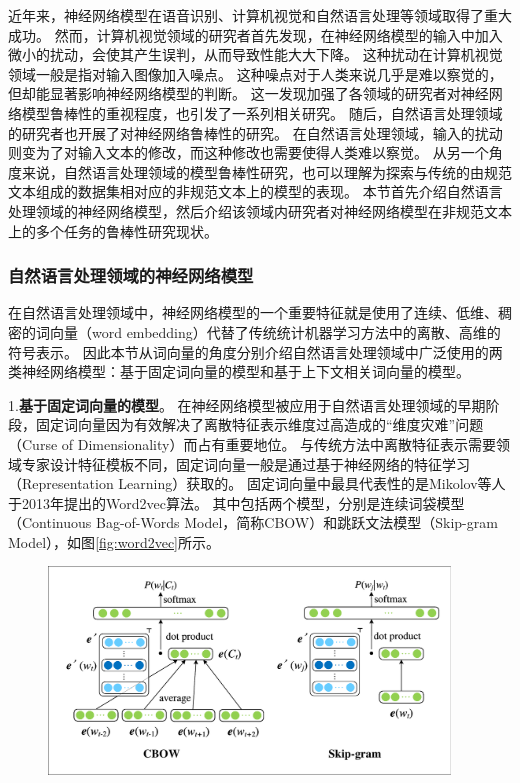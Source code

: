近年来，神经网络模型在语音识别、计算机视觉和自然语言处理等领域取得了重大成功。
然而，计算机视觉领域的研究者首先发现，在神经网络模型的输入中加入微小的扰动，会使其产生误判，从而导致性能大大下降。\cite{akhtar-etal-2018-threat}
这种扰动在计算机视觉领域一般是指对输入图像加入噪点。
这种噪点对于人类来说几乎是难以察觉的，但却能显著影响神经网络模型的判断。
这一发现加强了各领域的研究者对神经网络模型鲁棒性的重视程度，也引发了一系列相关研究。
随后，自然语言处理领域的研究者也开展了对神经网络鲁棒性的研究。\cite{zhang-etal-2020-adversarial}
在自然语言处理领域，输入的扰动则变为了对输入文本的修改，而这种修改也需要使得人类难以察觉。
从另一个角度来说，自然语言处理领域的模型鲁棒性研究，也可以理解为探索与传统的由规范文本组成的数据集相对应的非规范文本上的模型的表现。
本节首先介绍自然语言处理领域的神经网络模型，然后介绍该领域内研究者对神经网络模型在非规范文本上的多个任务的鲁棒性研究现状。

\subsubsection{自然语言处理领域的神经网络模型}

在自然语言处理领域中，神经网络模型的一个重要特征就是使用了连续、低维、稠密的词向量（word embedding）代替了传统统计机器学习方法中的离散、高维的符号表示。
因此本节从词向量的角度分别介绍自然语言处理领域中广泛使用的两类神经网络模型：基于固定词向量的模型和基于上下文相关词向量的模型。

1.\textbf{基于固定词向量的模型}。
在神经网络模型被应用于自然语言处理领域的早期阶段，固定词向量因为有效解决了离散特征表示维度过高造成的“维度灾难”问题（Curse of Dimensionality）而占有重要地位。
与传统方法中离散特征表示需要领域专家设计特征模板不同，固定词向量一般是通过基于神经网络的特征学习（Representation Learning）获取的。
固定词向量中最具代表性的是Mikolov等人于2013年提出的Word2vec算法\cite{mikolov-etal-2013-distributed}。
其中包括两个模型，分别是连续词袋模型（Continuous Bag-of-Words Model，简称CBOW）和跳跃文法模型（Skip-gram Model），如图\ref{fig:word2vec}所示。

\begin{figure}[htbp]
    \centering
    \includegraphics[width=0.95\textwidth]{figures/word2vec.pdf}
\end{figure}

